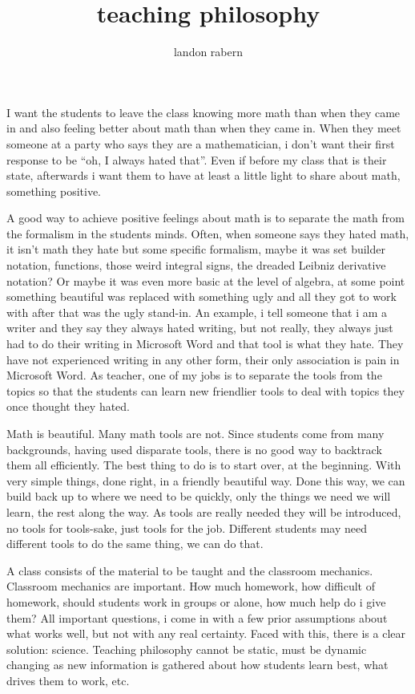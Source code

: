 \documentclass[12pt]{article}
\title{teaching philosophy}
\author{landon rabern}
\begin{document}
\maketitle

I want the students to leave the class knowing more math than when they came in and also feeling better about math than when they came in.  When 
they meet someone at a party who says they are a mathematician, i don't want their first response to be ``oh, I always hated that''.  Even if before my
class that is their state, afterwards i want them to have at least a little light to share about math, something positive.

A good way to achieve positive feelings about math is to separate the math from the formalism in the students minds.  Often, when someone says they hated math, it isn't math they hate
but some specific formalism, maybe it was set builder notation, functions, those weird integral signs, the dreaded Leibniz derivative notation?  Or maybe it was even more basic at
the level of algebra, at some point something beautiful was replaced with something ugly and all they got to work with after that was the ugly stand-in.  An example, i tell someone
that i am a writer and they say they always hated writing, but not really, they always just had to do their writing in Microsoft Word and that tool is what they hate.  They have
not experienced writing in any other form, their only association is pain in Microsoft Word.  As teacher, one of my jobs is to separate the tools from the topics so that the students can 
learn new friendlier tools to deal with topics they once thought they hated.

Math is beautiful.  Many math tools are not.  Since students come from many backgrounds, having used disparate tools, there is no good way to backtrack them all efficiently.  The
best thing to do is to start over, at the beginning.  With very simple things, done right, in a friendly beautiful way.  Done this way, we can build back up to where we need to be
quickly, only the things we need we will learn, the rest along the way.  As tools are really needed they will be introduced, no tools for tools-sake, just tools for the job.  Different
students may need different tools to do the same thing, we can do that.

A class consists of the material to be taught and the classroom mechanics. Classroom mechanics are important.  How much homework, how difficult of homework, should students work in groups or alone, how much help do i give them?
All important questions, i come in with a few prior assumptions about what works well, but not with any real certainty.  Faced with this, there is a clear solution: science.
Teaching philosophy cannot be static, must be dynamic changing as new information is gathered about how students learn best, what drives them to work, etc.  
\end{document}
